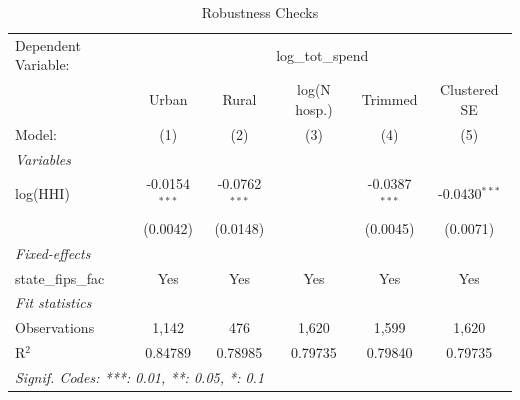 
\begin{table}[htbp]
   \caption{\label{tab:robust} Robustness Checks}
   \centering
   \begin{tabular}{lccccc}
      \tabularnewline \midrule \midrule
      Dependent Variable: & \multicolumn{5}{c}{log\_tot\_spend}\\
                         & Urban           & Rural           & log(N hosp.) & Trimmed         & Clustered SE \\   
      Model:             & (1)             & (2)             & (3)          & (4)             & (5)\\  
      \midrule
      \emph{Variables}\\
      log(HHI)           & -0.0154$^{***}$ & -0.0762$^{***}$ &              & -0.0387$^{***}$ & -0.0430$^{***}$\\   
                         & (0.0042)        & (0.0148)        &              & (0.0045)        & (0.0071)\\   
      \midrule
      \emph{Fixed-effects}\\
      state\_fips\_fac   & Yes             & Yes             & Yes          & Yes             & Yes\\  
      \midrule
      \emph{Fit statistics}\\
      Observations       & 1,142           & 476             & 1,620        & 1,599           & 1,620\\  
      R$^2$              & 0.84789         & 0.78985         & 0.79735      & 0.79840         & 0.79735\\  
      \midrule \midrule
      \multicolumn{6}{l}{\emph{Signif. Codes: ***: 0.01, **: 0.05, *: 0.1}}\\
   \end{tabular}
\end{table}


